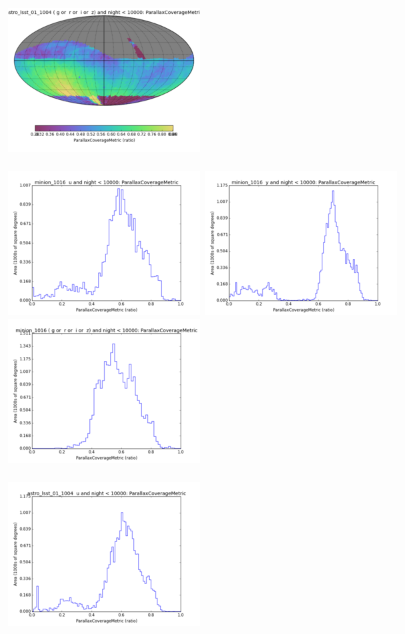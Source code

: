 \begin{figure}[ht]
\begin{center}
  \includegraphics[width=2.0in]{./figs/milkyway/astromPanels/MW_Astrom_paCovge_wfdPlane_10y_map.png}
  \end{center}

  \begin{center}
  \includegraphics[width=2.0in]{./figs/milkyway/astromPanels/MW_Astrom_paCovge_Baseline_u_hst.png}
  \includegraphics[width=2.0in]{./figs/milkyway/astromPanels/MW_Astrom_paCovge_Baseline_y_hst.png}
  \includegraphics[width=2.0in]{./figs/milkyway/astromPanels/MW_Astrom_paCovge_Baseline_10y_hst.png}
  \end{center}
  \begin{center}
  \includegraphics[width=2.0in]{./figs/milkyway/astromPanels/MW_Astrom_paCovge_wfdPlane_u_hst.png}

\end{center}
\end{figure}
